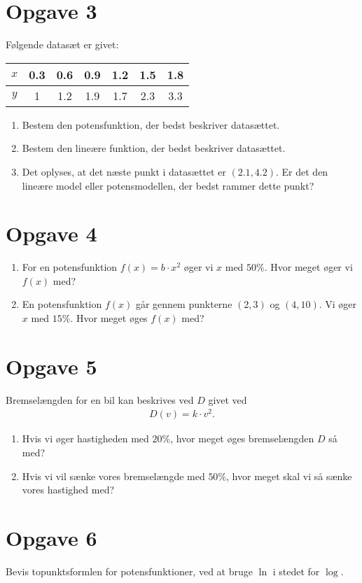 \section*{Opgave 3}
Følgende datasæt er givet:
\begin{center}
\begin{tabular}{c|c|c|c|c|c|c}
$x$& 0.3 & 0.6 & 0.9 & 1.2 & 1.5 & 1.8\\\hline
$y$ & 1 & 1.2 & 1.9 & 1.7 & 2.3 & 3.3\\
\end{tabular}
\end{center}
\begin{enumerate}[label=\roman*)]
\item Bestem den potensfunktion, der bedst beskriver datasættet.
\item Bestem den lineære funktion, der bedst beskriver datasættet. 
\item Det oplyses, at det næste punkt i datasættet er $(2.1,4.2)$. Er det den lineære model eller potensmodellen, der bedst rammer dette punkt?
\end{enumerate}

\section*{Opgave 4}
\begin{enumerate}[label=\roman*)]
\item For en potensfunktion $f(x) = b\cdot x^2$ øger vi $x$ med $50\%$. Hvor meget øger vi $f(x)$ med?
\item En potensfunktion $f(x)$ går gennem punkterne $(2,3)$ og $(4,10)$. Vi øger $x$ med $15\%$. Hvor meget øges $f(x)$ med?
\end{enumerate}
\section*{Opgave 5}
Bremselængden for en bil kan beskrives ved $D$ givet ved
\begin{align*}
D(v) = k\cdot v^2.
\end{align*}
\begin{enumerate}[label=\roman*)]
\item Hvis vi øger hastigheden med $20\%$, hvor meget øges bremselængden $D$ så med?
\item Hvis vi vil sænke vores bremselængde med $50\%$, hvor meget skal vi så sænke vores hastighed med?
\end{enumerate}

\section*{Opgave 6}
Bevis topunktsformlen for potensfunktioner, ved at bruge $\ln$ i stedet for $\log$.